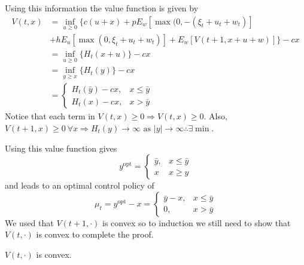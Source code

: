 Using this information the value function is given by
\begin{align*}
V(t,x) &= \inf_{u\geq 0} \{c(u+x) + pE_w[\max(0,-(\xi_t+u_t+w_t)] \\
&+ hE_u[\max(0,\xi_t+u_t+w_t)] + E_w[V(t+1,x+u+w)]\} - cx \\
&= \inf_{u\geq 0} \{H_t(x+u)\} - cx \\
&= \inf_{y\geq x}\{H_t(y)\} - cx \\
&= \begin{cases} H_t(\bar{y})-cx, & x\leq\bar{y} \\ H_t(x)-cx, & x>\bar{y} \end{cases}
\end{align*}
Notice that each term in $V(t,x)\geq 0 \Rightarrow V(t,x)\geq 0$. Also, $V(t+1,x)\geq 0 ~\forall x \Rightarrow H_t(y)\to\infty \text{ as } |y|\to\infty \therefore \exists \min$.

Using this value function gives
$$y^{\text{opt}} = \begin{cases} \bar{y}, & x\leq\bar{y} \\ x & x\geq y \end{cases}$$
and leads to an optimal control policy of
$$\mu_t = y^{\text{opt}}-x = \begin{cases} \bar{y}-x, & x\leq\bar{y} \\ 0, & x>\bar{y} \end{cases}$$
We used that $V(t+1,\cdot)$ is convex  so to induction we still need to show that $V(t,\cdot)$ is convex to complete the proof.

\begin{theorem}
$V(t,\cdot)$ is convex.
\end{theorem}

